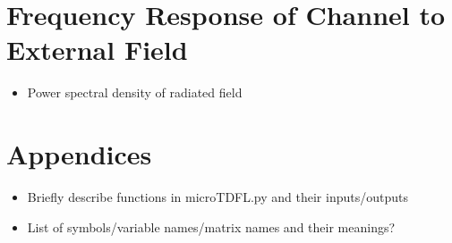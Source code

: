 \documentclass{article}
\begin{document}
\section{Frequency Response of Channel to External Field}
\begin{itemize}
\item Power spectral density of radiated field
\end{itemize}

\section*{Appendices}
\begin{itemize}
\item Briefly describe functions in microTDFL.py and their inputs/outputs
\item List of symbols/variable names/matrix names and their meanings?
\end{itemize}


\end{document}
